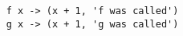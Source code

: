 \begin{verbatim}
    f x -> (x + 1, 'f was called')
    g x -> (x + 1, 'g was called')
\end{verbatim}
